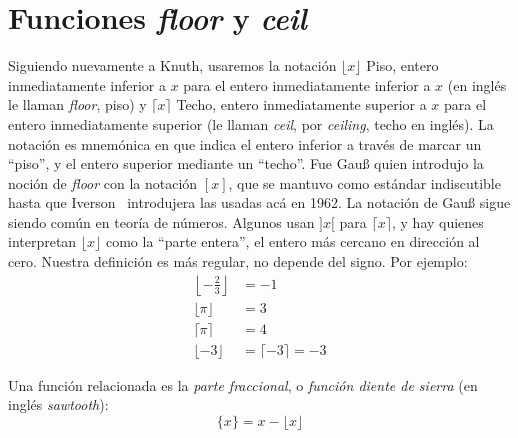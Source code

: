 \section{Funciones \emph{floor} y \emph{ceil}}
\label{sec:floor-ceil}

  Siguiendo nuevamente a Knuth,%
  usaremos la notación \(\lfloor x \rfloor\)
	     {Piso, entero inmediatamente inferior a \(x\)}
  para el entero inmediatamente inferior a \(x\)
  (en inglés le llaman \emph{\foreignlanguage{english}{floor}},
   piso)
  y \(\lceil x \rceil\)
	     {Techo, entero inmediatamente superior a \(x\)}
  para el entero inmediatamente superior
  (le llaman \emph{\foreignlanguage{english}{ceil}},
   por \emph{\foreignlanguage{english}{ceiling}},
   techo en inglés).
  La notación es mnemónica en que indica el entero inferior
  a través de marcar un ``piso'',
  y el entero superior mediante un ``techo''.
  Fue Gauß%
  quien introdujo
  la noción de \emph{\foreignlanguage{english}{floor}}
  con la notación \([x]\),
  que se mantuvo como estándar indiscutible hasta que Iverson~%
    \cite{iverson62:_APL}
  introdujera las usadas acá en 1962.
  La notación de Gauß sigue siendo común en teoría de números.
  Algunos usan \(]x[\) para \(\lceil x \rceil\),
  y hay quienes interpretan \(\lfloor x \rfloor\)
  como la ``parte entera'',
  el entero más cercano en dirección al cero.
  Nuestra definición es más regular,
  no depende del signo.
  Por ejemplo:
  \begin{align*}
    \left\lfloor -\frac{2}{3} \right\rfloor
      &= -1 \\
    \lfloor \pi \rfloor
      &= 3 \\
    \lceil \pi \rceil
      &= 4 \\
    \lfloor -3 \rfloor
      &= \lceil -3 \rceil
      = -3
  \end{align*}

  Una función relacionada es la \emph{parte fraccional},%
  o \emph{función diente de sierra}%
  (en inglés \emph{\foreignlanguage{english}{sawtooth}}):
  \begin{equation}
    \label{eq:def-diente-sierra}
    \{x\}
      = x - \lfloor x \rfloor
  \end{equation}

